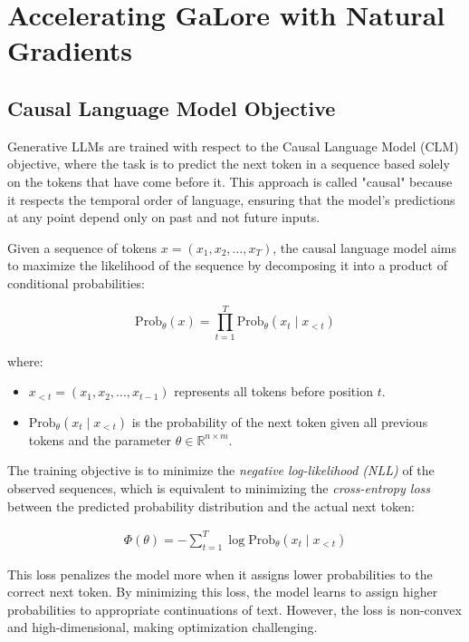 \section{Accelerating GaLore with Natural Gradients}

\subsection{Causal Language Model Objective}

Generative LLMs are trained with respect to the Causal Language Model (CLM) objective, where the task is to predict the next token in a sequence based solely on the tokens that have come before it. This approach is called "causal" because it respects the temporal order of language, ensuring that the model's predictions at any point depend only on past and not future inputs.

Given a sequence of tokens \( x = (x_1, x_2, \dots, x_T) \), the causal language model aims to maximize the likelihood of the sequence by decomposing it into a product of conditional probabilities:

\[
\text{Prob}_{\theta}(x) = \prod_{t=1}^T \text{Prob}_{\theta}(x_t \mid x_{<t})
\]

where:

\begin{itemize}
    \item \( x_{<t} = (x_1, x_2, \dots, x_{t-1}) \) represents all tokens before position \( t \).
    \item \( \text{Prob}_{\theta}(x_t \mid x_{<t}) \) is the probability of the next token given all previous tokens and the parameter \( \theta \in \mathbb{R}^{n \times m} \).
\end{itemize}

The training objective is to minimize the \textit{negative log-likelihood (NLL)} of the observed sequences, which is equivalent to minimizing the \textit{cross-entropy loss} between the predicted probability distribution and the actual next token:

\begin{eqnarray}
\Phi(\theta) = -\sum_{t=1}^T \log \text{Prob}_{\theta}(x_t \mid x_{<t})
\label{eq:cross_entropy_loss}
\end{eqnarray}

This loss penalizes the model more when it assigns lower probabilities to the correct next token. By minimizing this loss, the model learns to assign higher probabilities to appropriate continuations of text. However, the loss is non-convex and high-dimensional, making optimization challenging.

